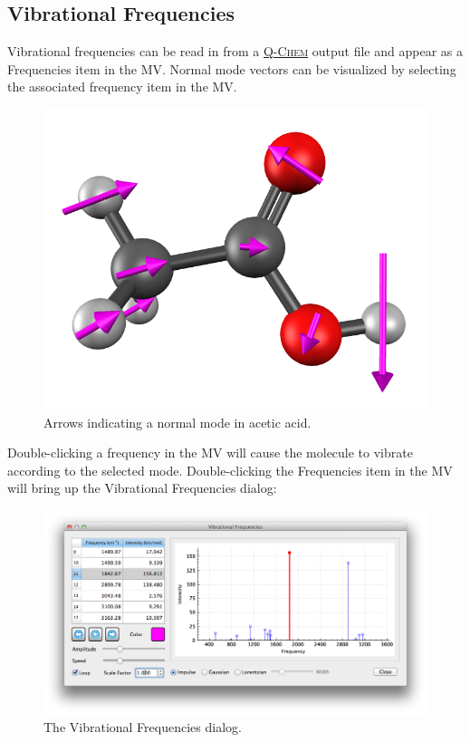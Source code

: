 \documentclass[a4paper,12pt]{article}
\newcommand{\qchem}{\href{http://q-chem.com}{{\scshape Q-Chem}}}
\begin{document}
\subsection{Vibrational Frequencies}

Vibrational frequencies can be read in from a \qchem{} output file and appear
as a Frequencies item in the MV.  Normal mode vectors can be visualized by
selecting the associated frequency item in the MV.
\begin{figure}[h]
\begin{center}
\includegraphics[scale=0.23]{figures/VibMode.png}
\caption{Arrows indicating a normal mode in acetic acid.}
\end{center}
\end{figure}

Double-clicking a frequency in the MV will cause the molecule to vibrate
according to the selected mode.  Double-clicking the Frequencies item in the 
MV will bring up the Vibrational Frequencies dialog:
\begin{figure}[h]
\begin{center}
\includegraphics[scale=0.40]{figures/Frequencies.png}
\caption{The Vibrational Frequencies dialog.}
\end{center}
\end{figure}
\end{document}
